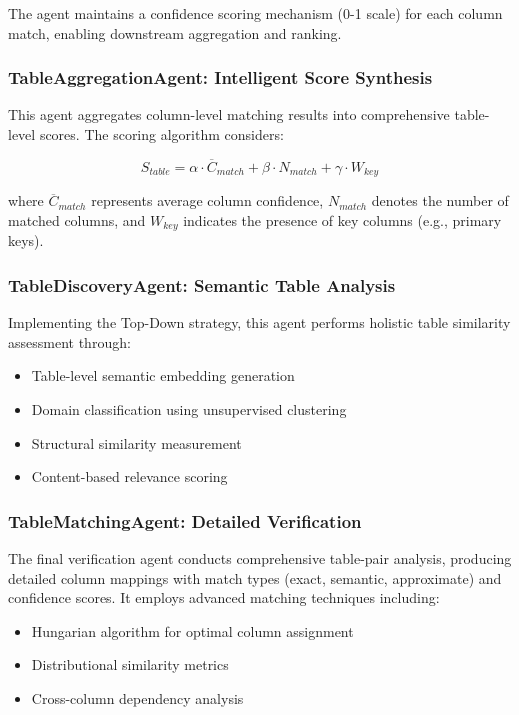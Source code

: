 \documentclass[conference]{IEEEtran}
\begin{document}
The agent maintains a confidence scoring mechanism (0-1 scale) for each column match, enabling downstream aggregation and ranking.

\subsubsection{TableAggregationAgent: Intelligent Score Synthesis}

This agent aggregates column-level matching results into comprehensive table-level scores. The scoring algorithm considers:

\begin{equation}
S_{table} = \alpha \cdot \overline{C}_{match} + \beta \cdot N_{match} + \gamma \cdot W_{key}
\end{equation}

where $\overline{C}_{match}$ represents average column confidence, $N_{match}$ denotes the number of matched columns, and $W_{key}$ indicates the presence of key columns (e.g., primary keys).

\subsubsection{TableDiscoveryAgent: Semantic Table Analysis}

Implementing the Top-Down strategy, this agent performs holistic table similarity assessment through:

\begin{itemize}
    \item Table-level semantic embedding generation
    \item Domain classification using unsupervised clustering
    \item Structural similarity measurement
    \item Content-based relevance scoring
\end{itemize}

\subsubsection{TableMatchingAgent: Detailed Verification}

The final verification agent conducts comprehensive table-pair analysis, producing detailed column mappings with match types (exact, semantic, approximate) and confidence scores. It employs advanced matching techniques including:

\begin{itemize}
    \item Hungarian algorithm for optimal column assignment
    \item Distributional similarity metrics
    \item Cross-column dependency analysis
\end{itemize}
\end{document}

